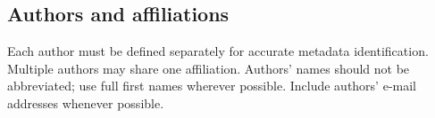 \documentclass[%
]{ittmm}
\begin{document}





\subsection{Authors and affiliations}

Each author must be defined separately for accurate metadata identification.
Multiple authors may share one affiliation.
Authors' names should not be abbreviated; use full first names wherever possible.
Include authors' e-mail addresses whenever possible.

\end{document}
